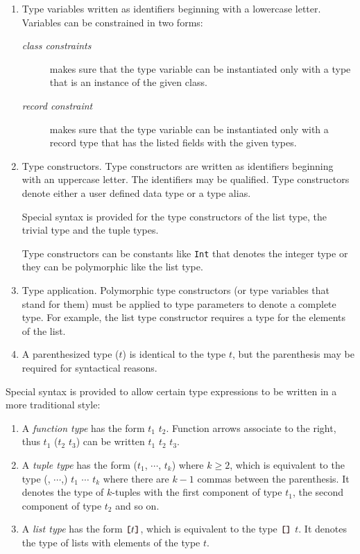 \begin{enumerate}
\item Type variables written as identifiers beginning with a lowercase letter. Variables can be constrained in two forms: \label{constraint}
\begin{description}
\item[\emph{class constraints}] makes sure that the type variable can be instantiated only with a type that is an instance of the given class.
\item[\emph{record constraint}] makes sure that the type variable can be instantiated only with a record type that has the listed fields with the given types.
\end{description}
\item Type constructors. Type constructors are written as identifiers beginning with an uppercase letter. The identifiers may be qualified. Type constructors denote either a user defined data type or a type alias.

Special syntax is provided for the type constructors of the list type, the trivial type and the tuple types.

Type constructors can be constants like \texttt{Int} that denotes the integer type or they can be polymorphic like the list type.
\item Type application. Polymorphic type constructors (or type variables that stand for them) must be applied to type parameters to denote a complete type. For example, the list type constructor requires a type for the elements of the list.
\item A parenthesized type ($t$) is identical to the type $t$, but the parenthesis may be required for syntactical reasons.
\end{enumerate}

Special syntax is provided to allow certain type expressions to be written in a more traditional style:

\begin{enumerate}
\item A \emph{function type} has the form $t_1$ \arrow{} $t_2$. Function arrows associate to the right, thus $t_1$ \arrow{} ($t_2$ \arrow{} $t_3$) can be written $t_1$ \arrow{} $t_2$ \arrow{} $t_3$.
\item A \emph{tuple type} has the form ($t_1$, $\cdots$, $t_k$) where $k\ge{}2$, which is equivalent to the type (, $\cdots$,) $t_1$ $\cdots$ $t_k$ where there are $k-1$ commas between the parenthesis.
It denotes the type of $k$-tuples with the first component of type $t_1$, the second component of type $t_2$ and so on.
\item A \emph{list type} has the form $\bracka{}t\brackz{}$, which is equivalent to the type $\bracka{}\brackz{}$ $t$. It denotes the type of lists with elements of the type $t$.
\end{enumerate}

